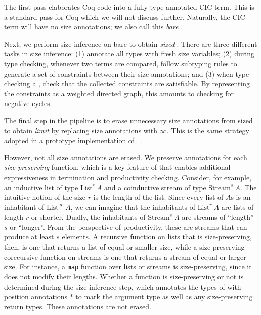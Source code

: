 The first pass elaborates Coq code into a fully type-annotated CIC term.
This is a standard pass for Coq which we will not discuss further.
Naturally, the CIC term will have no size annotations; we also call this \emph{bare} \lang.

Next, we perform size inference on bare \lang to obtain \emph{sized} \lang.
There are three different tasks in size inference: (1) annotate all \coinductive types with fresh size variables; (2) during type checking, whenever two terms are compared, follow subtyping rules to generate a set of constraints between their size annotations; and (3) when type checking a \cofixpoint, check that the collected constraints are satisfiable.
By representing the constraints as a weighted directed graph, this amounts to checking for negative cycles.

The final step in the pipeline is to erase unnecessary size annotations from sized \lang to obtain \emph{limit} \lang by replacing size annotations with $\infty$.
This is the same strategy adopted in a prototype implementation of \CIChatminus~\citep{cicminus}.

However, not all size annotations are erased.
We preserve annotations for each \emph{size-preserving} \corecursive function, which is a key feature of \lang that enables additional expressiveness in termination and productivity checking.
Consider, for example, an inductive list of type $\text{List}^r ~ A$ and a coinductive stream of type $\text{Stream}^s ~ A$.
The intuitive notion of the size $r$ is the length of the list.
Since every list of $A$s is an inhabitant of $\text{List}^\infty ~ A$, we can imagine that the inhabitants of $\text{List}^r ~ A$ are lists of length $r$ or shorter.
Dually, the inhabitants of $\text{Stream}^s ~ A$ are streams of ``length'' $s$ or ``longer''.
From the perspective of productivity, these are streams that can produce at least $s$ elements.
A recursive function on lists that is size-preserving, then, is one that returns a list of equal or smaller size, while a size-preserving corecursive function on streams is one that returns a stream of equal or larger size.
For instance, a \texttt{map} function over lists or streams is size-preserving, since it does not modify their lengths.
Whether a \corecursive function is size-preserving or not is determined during the size inference step, which annotates the types of \cofixpoints with position annotations $*$ to mark the \corecursive argument type as well as any size-preserving return types.
These annotations are not erased.

